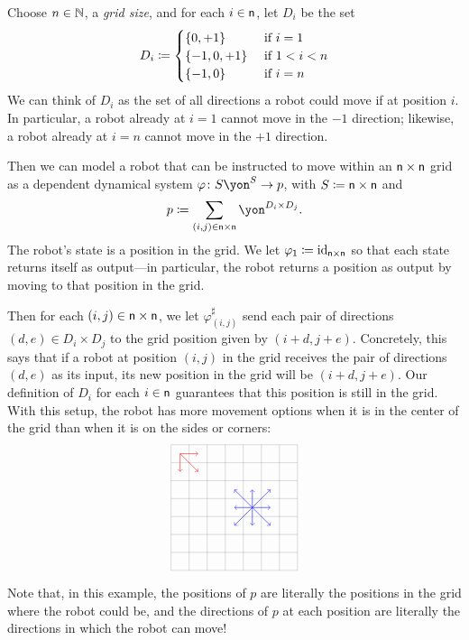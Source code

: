 \documentclass[Book-Poly]{subfiles}
\begin{document}
\begin{example}\label{ex.grid_robot}
Choose $n\in\mathbb{N}$, a \emph{grid size}, and for each $i\in\mathsf{n}$, let $D_i$ be the set
\[
	D_i\coloneqq
	\begin{cases}
		\{0,+1\}&\textnormal{ if }i=1\\
		\{-1,0,+1\}&\textnormal{ if } 1<i<n\\
		\{-1,0\}&\textnormal{ if }i=n
	\end{cases}
\]
We can think of $D_i$ as the set of all directions a robot could move if at position $i$.
In particular, a robot already at $i=1$ cannot move in the $-1$ direction; likewise, a robot already at $i=n$ cannot move in the $+1$ direction.

Then we can model a robot that can be instructed to move within an $\mathsf{n}\times\mathsf{n}$ grid as a dependent dynamical system $\varphi\colon S\yon^S\to p$, with $S\coloneqq\mathsf{n}\times\mathsf{n}$ and
\[
    p\coloneqq\sum_{(i,j)\in\ord{n}\times\ord{n}}\yon^{D_i\times D_j}.
\]
The robot's state is a position in the grid.
We let $\varphi_{\textsf{1}}\coloneqq\mathrm{id}_{\mathsf{n}\times\mathsf{n}}$ so that each state returns itself as output---in particular, the robot returns a position as output by moving to that position in the grid.

Then for each $(i,j)\in\mathsf{n}\times\mathsf{n}$, we let $\varphi^\sharp_{(i,j)}$ send each pair of directions $(d,e)\in D_i\times D_j$ to the grid position given by $(i+d,j+e)$.
Concretely, this says that if a robot at position $(i,j)$ in the grid receives the pair of directions $(d,e)$ as its input, its new position in the grid will be $(i+d,j+e)$.
Our definition of $D_i$ for each $i\in\mathsf{n}$ guarantees that this position is still in the grid.
With this setup, the robot has more movement options when it is in the center of the grid than when it is on the sides or corners:
\[
\begin{tikzpicture}[scale=.5]
  \draw[step=1cm,gray,very thin] (-3,-3) grid (4,4);
	\draw[->, red ] (-2.5,3.5) -- (-1.5, 3.5);
	\draw[->, red ] (-2.5,3.5) -- (-1.5, 2.5);
	\draw[->, red ] (-2.5,3.5) -- (-2.5, 2.5);
	\draw[->, blue] (1.5, 0.5) -- (0.5, 0.5);
	\draw[->, blue] (1.5, 0.5) -- (2.5, 0.5);
	\draw[->, blue] (1.5, 0.5) -- (1.5, 1.5);
	\draw[->, blue] (1.5, 0.5) -- (1.5,-0.5);
	\draw[->, blue] (1.5, 0.5) -- (0.5, 1.5);
	\draw[->, blue] (1.5, 0.5) -- (0.5,-0.5);
	\draw[->, blue] (1.5, 0.5) -- (2.5, 1.5);
	\draw[->, blue] (1.5, 0.5) -- (2.5,-0.5);
\end{tikzpicture}
\]

Note that, in this example, the positions of $p$ are literally the positions in the grid where the robot could be, and the directions of $p$ at each position are literally the directions in which the robot can move!
\end{example}
\end{document}
